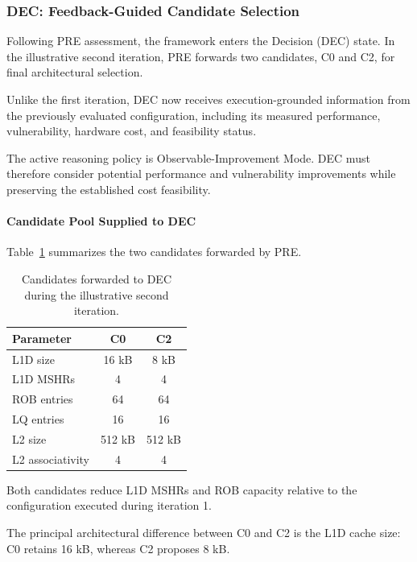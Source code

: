 \subsubsection{DEC: Feedback-Guided Candidate Selection}
\label{app:illustrative_dec2}

Following PRE assessment, the framework enters
the Decision (DEC) state. In the illustrative
second iteration, PRE forwards two candidates,
C0 and C2, for final architectural selection.

Unlike the first iteration, DEC now receives
execution-grounded information from the
previously evaluated configuration, including
its measured performance, vulnerability,
hardware cost, and feasibility status.

The active reasoning policy is
Observable-Improvement Mode. DEC must therefore
consider potential performance and vulnerability
improvements while preserving the established
cost feasibility.

\paragraph{Candidate Pool Supplied to DEC}

Table~\ref{tab:illustrative_dec2_candidates}
summarizes the two candidates forwarded by PRE.

\begin{table}[htbp]
\centering
\caption{Candidates forwarded to DEC during
the illustrative second iteration.}
\label{tab:illustrative_dec2_candidates}
\renewcommand{\arraystretch}{1.1}
\begin{tabular}{lcc}
\hline
\textbf{Parameter} &
\textbf{C0} &
\textbf{C2} \\
\hline
L1D size & 16 kB & 8 kB \\
L1D MSHRs & 4 & 4 \\
ROB entries & 64 & 64 \\
LQ entries & 16 & 16 \\
L2 size & 512 kB & 512 kB \\
L2 associativity & 4 & 4 \\
\hline
\end{tabular}
\end{table}

Both candidates reduce L1D MSHRs and ROB
capacity relative to the configuration
executed during iteration 1.

The principal architectural difference
between C0 and C2 is the L1D cache size:
C0 retains 16 kB, whereas C2 proposes
8 kB.

